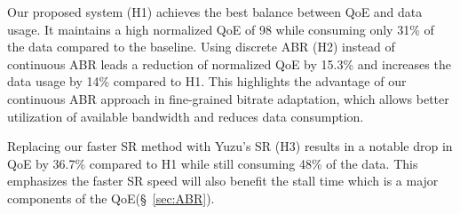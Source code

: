 Our proposed system (H1) achieves the best balance between QoE and data usage. It maintains a high normalized QoE of 98 while consuming only 31\% of the data compared to the baseline.
Using discrete ABR (H2) instead of continuous ABR leads a reduction of normalized QoE by 15.3\% and increases the data usage by 14\% compared to H1. This highlights the advantage of our continuous ABR approach in fine-grained bitrate adaptation, which allows better utilization of available bandwidth and reduces data consumption.

Replacing our faster SR method with Yuzu's SR (H3) results in a notable drop in QoE by 36.7\% compared to H1 while still consuming 48\% of the data. This emphasizes the faster SR speed will also benefit the stall time which is a major components of the QoE(\S~\ref{sec:ABR}).







